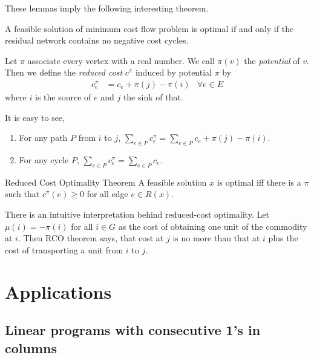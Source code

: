 \documentclass[UTF8,a4paper]{ctexart}
\begin{document}
These lemmas imply the following interesting theorem.

\begin{theorem}
    A feasible solution of minimum cost flow problem is optimal if and only if the residual network contains no negative cost cycles.
\end{theorem}

\begin{definition}
    Let $\pi$ associate every vertex with a real number.
    We call $\pi(v)$ the \emph{potential} of $v$.
    Then we define the \emph{reduced cost} $c^\pi$ induced by potential $\pi$ by
    \begin{align}
        c^\pi_e&=c_e + \pi(j) - \pi(i) &\forall e\in E
    \end{align}
    where $i$ is the source of $e$ and $j$ the sink of that.

    It is easy to see,
    \begin{enumerate}
        \item For any path $P$ from $i$ to $j$, $\sum_{e\in P}c^\pi_e = \sum_{e\in P}c_e + \pi(j) - \pi(i)$.
        \item For any cycle $P$, $\sum_{e\in P}c^\pi_e = \sum_{e\in P} c_e$.
    \end{enumerate}
\end{definition}

\begin{theorem}{Reduced Cost Optimality Theorem}
    A feasible solution $x$ is optimal iff there is a $\pi$ such that $c^\pi(e)\geq 0$ for all edge $e\in R(x)$.
\end{theorem}

There is an intuitive interpretation behind reduced-cost optimality.
Let $\mu(i)=-\pi(i)$ for all $i\in G$ as the cost of obtaining one unit of the commodity at $i$.
Then RCO theorem says, that cost at $j$ is no more than that at $i$ plus the cost of transporting a unit from $i$ to $j$.

\section{Applications}

\subsection{Linear programs with consecutive 1's in columns}
\end{document}

